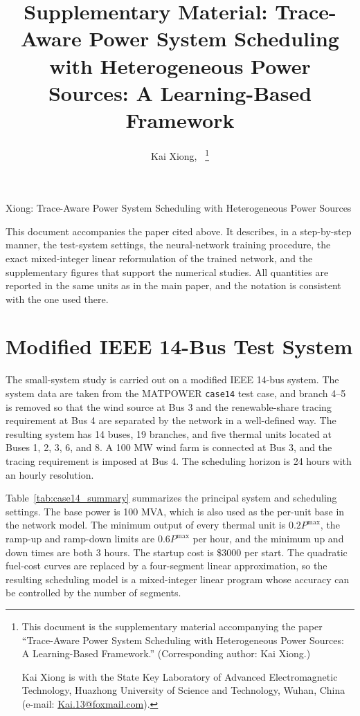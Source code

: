 \documentclass[letterpaper,journal]{IEEEtran}
\begin{document}
\title{Supplementary Material: Trace-Aware Power System Scheduling with Heterogeneous
Power Sources: A Learning-Based Framework}
\author{Kai Xiong,~
\thanks{This document is the supplementary material accompanying the paper ``Trace-Aware
Power System Scheduling with Heterogeneous Power Sources: A Learning-Based Framework.''
(Corresponding author: Kai Xiong.)\par
Kai Xiong is with the State Key Laboratory of Advanced Electromagnetic Technology,
Huazhong University of Science and Technology, Wuhan, China (e-mail:
\protect\url{Kai.13@foxmail.com}).}}
%
{Xiong: Trace-Aware Power System Scheduling with Heterogeneous Power Sources}
\maketitle

This document accompanies the paper cited above. It describes, in a step-by-step manner,
the test-system settings, the neural-network training procedure, the exact mixed-integer
linear reformulation of the trained network, and the supplementary figures that support
the numerical studies. All quantities are reported in the same units as in the main
paper, and the notation is consistent with the one used there.

\section{Modified IEEE 14-Bus Test System}

The small-system study is carried out on a modified IEEE 14-bus system. The system data are
taken from the MATPOWER \texttt{case14} test case, and branch 4--5 is removed so that the
wind source at Bus 3 and the renewable-share tracing requirement at Bus 4 are separated by
the network in a well-defined way. The resulting system has 14 buses, 19 branches, and five
thermal units located at Buses 1, 2, 3, 6, and 8. A 100 MW wind farm is connected at Bus 3,
and the tracing requirement is imposed at Bus 4. The scheduling horizon is 24 hours with an
hourly resolution.

Table~\ref{tab:case14_summary} summarizes the principal system and scheduling settings. The
base power is 100 MVA, which is also used as the per-unit base in the network model. The
minimum output of every thermal unit is $0.2P^{\max}$, the ramp-up and ramp-down limits are
$0.6P^{\max}$ per hour, and the minimum up and down times are both 3 hours. The startup cost
is \$3000 per start. The quadratic fuel-cost curves are replaced by a four-segment linear
approximation, so the resulting scheduling model is a mixed-integer linear program whose
accuracy can be controlled by the number of segments.
\end{document}
